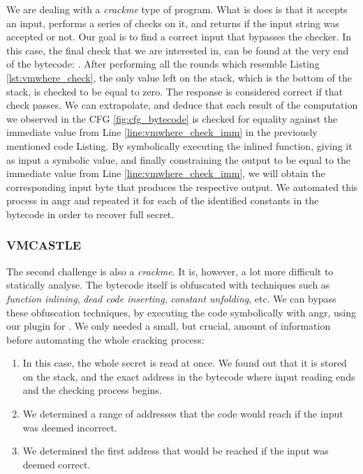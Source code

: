 We are dealing with a \emph{crackme} type of program. What is does is that it accepts an input, performs a series of checks on it, and returns if the input string was accepted or not. Our goal is to find a correct input that bypasses the checker. In this case, the final check that we are interested in, can be found at the very end of the bytecode: . After performing all the rounds which resemble Listing \ref{lst:vmwhere_check}, the only value left on the stack, which is the bottom of the stack, is checked to be equal to zero. The response is considered correct if that check passes. We can extrapolate, and deduce that each result of the computation we observed in the \gls{CFG} \ref{fig:cfg_bytecode} is checked for equality against the immediate value from Line \ref{line:vmwhere_check_imm} in the previously mentioned code Listing. By symbolically executing the inlined function, giving it as input a symbolic value, and finally constraining the output to be equal to the immediate value \cc{\xZZ} from Line \ref{line:vmwhere_check_imm}, we will obtain the corresponding input byte that produces the respective output. We automated this process in angr and repeated it for each of the identified constants in the bytecode in order to recover full secret.

\subsubsection{VMCASTLE}

The second challenge is also a \emph{crackme}. It is, however, a lot more difficult to statically analyse. The bytecode itself is obfuscated with techniques such as \emph{function inlining}, \emph{dead code inserting}, \emph{constant unfolding}, etc. We can bypass these obfuscation techniques, by executing the code symbolically with angr, using our plugin for . We only needed a small, but crucial, amount of information before automating the whole cracking process:

\begin{enumerate}
    \item In this case, the whole secret is read at once. We found out that it is stored on the stack, and the exact address in the bytecode where input reading ends and the checking process begins. \label{item:one}
    \item We determined a range of addresses that the code would reach if the input was deemed incorrect. \label{item:two}
    \item We determined the first address that would be reached if the input was deemed correct. \label{item:three}
\end{enumerate}

